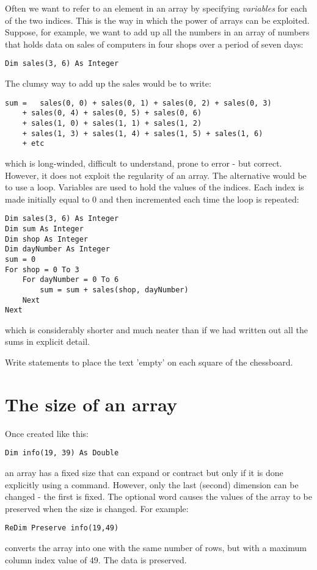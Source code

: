 		Often we want to refer to an element in an array by specifying \emph{variables} for each of the two indices. This is the way in which the power of arrays can be exploited. Suppose, for example, we want to add up all the numbers in an array of numbers that holds data on sales of computers in four shops over a period of seven days:
		\begin{lstlisting}
Dim sales(3, 6) As Integer
		\end{lstlisting}
		The clumsy way to add up the sales would be to write:
		\begin{lstlisting}
sum =	sales(0, 0) + sales(0, 1) + sales(0, 2) + sales(0, 3)
	+ sales(0, 4) + sales(0, 5) + sales(0, 6)
	+ sales(1, 0) + sales(1, 1) + sales(1, 2)
	+ sales(1, 3) + sales(1, 4) + sales(1, 5) + sales(1, 6)
	+ etc
		\end{lstlisting}
		which is long-winded, difficult to understand, prone to error - but correct. However, it does not exploit the regularity of an array. The alternative would be to use a  loop. Variables are used to hold the values of the indices. Each index is made initially equal to 0 and then incremented each time the loop is repeated:
		\begin{lstlisting}
Dim sales(3, 6) As Integer
Dim sum As Integer
Dim shop As Integer
Dim dayNumber As Integer
sum = 0
For shop = 0 To 3
	For dayNumber = 0 To 6
		sum = sum + sales(shop, dayNumber)
	Next
Next
		\end{lstlisting}
		which is considerably shorter and much neater than if we had written out all the sums in explicit detail.

		\begin{stqb}
			\begin{STQ}
			\item Write statements to place the text 'empty' on each square of the chessboard.
			\end{STQ}
		\end{stqb}


	\section{The size of an array}
		Once created like this:
		\begin{lstlisting}
Dim info(19, 39) As Double
		\end{lstlisting}
		an array has a fixed size that can expand or contract but only if it is done explicitly using a  command. However, only the last (second) dimension can be changed - the first is fixed. The optional word  causes the values of the array to be preserved when the size is changed. For example:
		\begin{lstlisting}
ReDim Preserve info(19,49)
		\end{lstlisting}
		converts the array into one with the same number of rows, but with a maximum column index value of 49. The data is preserved.
		

